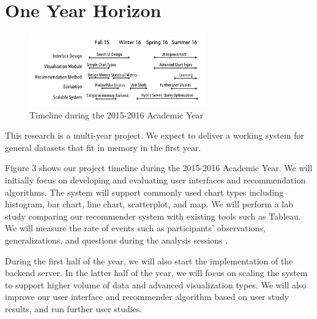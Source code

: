 \section*{One Year Horizon}

\begingroup
\setlength{\columnsep}{16pt}

\begin{figure}
\vspace{-0.4in}

  \includegraphics[width=3in]{gantt-chart.png}
  \vspace{-0.3in}
  \caption{Timeline during the 2015-2016 Academic Year}

\label{fig:plan}
\vspace{-0.1in}
\end{figure}


This research is a multi-year project.  We expect to deliver a working system for general datasets that fit in memory in the first year.

Figure 3 shows our project timeline during the 2015-2016 Academic Year.
We will initially focus on developing and evaluating user interfaces and recommendation algorithms.
The system will support commonly used chart types including histogram, bar chart, line chart, scatterplot, and map.
We will perform a lab study comparing our recommender system with existing tools such as Tableau.
We will measure the rate of events such as participants’ observations, generalizations, and questions during the analysis sessions \cite{liu:latency}.

During the first half of the year, we will also start the implementation of the backend server.  In the latter half of the year, we will focus on scaling the system to support higher volume of data and advanced visualization types. We will also improve our user interface and recommender algorithm based on user study results, and run further user studies.
\endgroup

